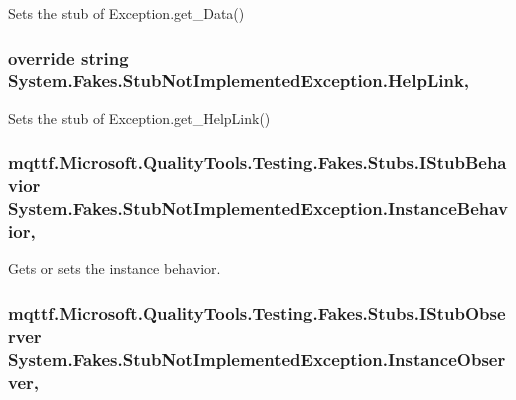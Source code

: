 Sets the stub of Exception.\-get\-\_\-\-Data()

\hypertarget{class_system_1_1_fakes_1_1_stub_not_implemented_exception_a764741cd612b4bb1ce21de5fef3193d0}{
\subsubsection[{Help\-Link}]{\setlength{\rightskip}{0pt plus 5cm}override string System.\-Fakes.\-Stub\-Not\-Implemented\-Exception.\-Help\-Link\hspace{0.3cm}{\ttfamily [get]}, {\ttfamily [set]}}}\label{class_system_1_1_fakes_1_1_stub_not_implemented_exception_a764741cd612b4bb1ce21de5fef3193d0}


Sets the stub of Exception.\-get\-\_\-\-Help\-Link()

\hypertarget{class_system_1_1_fakes_1_1_stub_not_implemented_exception_a51dbfdb69fb29134831e2a5f4eab6a88}{
\subsubsection[{Instance\-Behavior}]{\setlength{\rightskip}{0pt plus 5cm}mqttf.\-Microsoft.\-Quality\-Tools.\-Testing.\-Fakes.\-Stubs.\-I\-Stub\-Behavior System.\-Fakes.\-Stub\-Not\-Implemented\-Exception.\-Instance\-Behavior\hspace{0.3cm}{\ttfamily [get]}, {\ttfamily [set]}}}\label{class_system_1_1_fakes_1_1_stub_not_implemented_exception_a51dbfdb69fb29134831e2a5f4eab6a88}


Gets or sets the instance behavior.

\hypertarget{class_system_1_1_fakes_1_1_stub_not_implemented_exception_a67b9dfd0d4acba21de1def5cd11a4f95}{
\subsubsection[{Instance\-Observer}]{\setlength{\rightskip}{0pt plus 5cm}mqttf.\-Microsoft.\-Quality\-Tools.\-Testing.\-Fakes.\-Stubs.\-I\-Stub\-Observer System.\-Fakes.\-Stub\-Not\-Implemented\-Exception.\-Instance\-Observer\hspace{0.3cm}{\ttfamily [get]}, {\ttfamily [set]}}}\label{class_system_1_1_fakes_1_1_stub_not_implemented_exception_a67b9dfd0d4acba21de1def5cd11a4f95}


